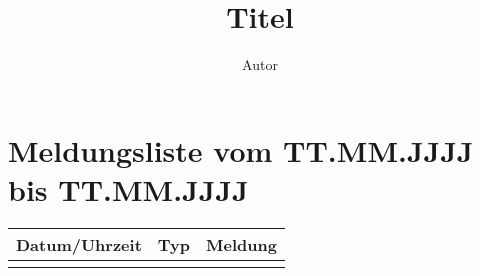 \documentclass[a4paper,10pt,BCOR=7.5mm,DIV=14]{scrartcl}
\title{Titel}
\author{Autor}
\begin{document}

\section*{Meldungsliste vom TT.MM.JJJJ bis TT.MM.JJJJ}

\begin{longtable}{|l|c|p{11cm}|}
  \hline
  \textbf{Datum/Uhrzeit} & \textbf{Typ} & \textbf{Meldung}\\
  \hline \hline
  \endhead
  \hline \endfoot
  
\end{longtable}
\end{document}
